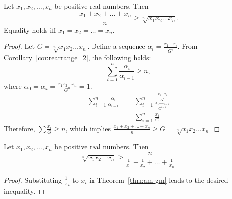 \documentclass[../main.tex]{subfiles}
\begin{document}
\begin{thm} \label{thm:am-gm}
    Let $x_1, x_2, \dots, x_n$ be positive real numbers.
    Then
    \[
        \frac{x_1 + x_2 + \dots + x_n}{n} \geq \sqrt[n]{x_1 x_2 \dots x_n}.
    \]
    Equality holds iff $x_1 = x_2 = \dots = x_n$.
\end{thm}
\begin{proof}
    Let $G = \sqrt[n]{x_1 x_2 \dots x_n}$.
    Define a sequence $\alpha_i = \frac{x_1 \dots x_i}{G^i}$.
    From Corollary~\ref{cor:rearrange_2}, the following holds:
    \[
        \sum_{i=1}^n \frac{\alpha_i}{\alpha_{i-1}} \geq n,
    \]
    where $\alpha_0 = \alpha_n = \frac{x_1 x_2 \dots x_n}{G^n} = 1$.
    \begin{align*}
        \sum_{i=1}^n \frac{\alpha_i}{\alpha_{i-1}} &= \sum_{i=1}^n \frac{\frac{x_1 \dots x_i}{G^i}}{\frac{x_1 \dots x_{i-1}}{G^{i-1}}}\\
                                                   &= \sum_{i=1}^n \frac{x_i}{G}
    \end{align*}
    Therefore, $\sum \frac{x_i}{G} \geq n$, which implies $\frac{x_1 + x_2 + \dots + x_n}{n} \geq G = \sqrt[n]{x_1 x_2 \dots x_n}$
\end{proof}

\begin{prop} \label{prop:gm-hm}
    Let $x_1, x_2, \dots, x_n$ be positive real numbers.
    Then
    \[
        \sqrt[n]{x_1 x_2 \dots x_n} \geq \frac{n}{\frac{1}{x_1} + \frac{1}{x_2} + \dots + \frac{1}{x_n}}.
    \]
\end{prop}
\begin{proof}
    Substituting $\frac 1 x_i$ to $x_i$ in Theorem~\ref{thm:am-gm} leads to the desired inequality.
\end{proof}
\end{document}
